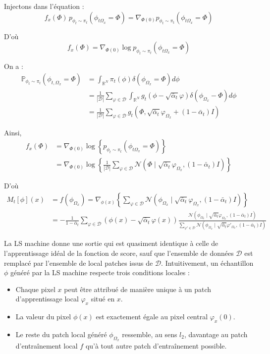 \documentclass[a4paper,10pt]{article}
\theoremstyle{definition} %
\theoremstyle{definition} %
\theoremstyle{definition} %
\theoremstyle{definition} %
\begin{document}
Injectons dans l'équation :
\[ f_x(\Phi)\, p_{\phi_t \sim \pi_t} (\phi_{t \Omega_x} = \Phi) = \nabla_{\Phi(0)} p_{\phi_t \sim \pi_t} (\phi_{t \Omega_x} = \Phi) \]

D'où
\[ f_x(\Phi) = \nabla_{\Phi(0)} \log p_{\phi_t \sim \pi_t} (\phi_{t\Omega_x} = \Phi) \]

On a :
\begin{align*}
\mathbb{P}_{\phi_t \sim \pi_t} (\phi_{t, \Omega_x} = \Phi) &= \int_{\mathbb{R}^N} \pi_t(\phi) \delta(\phi_{\Omega_x} = \Phi) d\phi \\
&= \frac{1}{|\mathcal{D}|} \sum\limits_{\varphi \in \mathcal{D}} \int_{\mathbb{R}^N} g_t(\phi - \sqrt{\bar \alpha_t} \varphi) \delta(\phi_{\Omega_x} - \Phi) d\phi \\
&= \frac{1}{|\mathcal{D}|} \sum\limits_{\varphi \in \mathcal{D}} g_t(\Phi, \sqrt{\bar \alpha_t} \varphi_{\Omega_x} + (1 - \bar \alpha_t) I)
\end{align*}

Ainsi,
\begin{align*}
    f_x(\Phi) &= \nabla_{\Phi(0)} \log \left\{p_{\phi_t \sim \pi_t} (\phi_{t\Omega_x} = \Phi)\right\} \\
    &=\nabla_{\Phi(0)} \log \left\{ \frac{1}{|\mathcal{D}|} \sum\limits_{\varphi \in \mathcal{D}} \mathcal{N}(\Phi \mid \sqrt{\bar \alpha_t} \varphi_{\Omega_x}, (1 - \bar\alpha_t) I) \right\}
\end{align*}

D'où
\begin{align*}
M_t[\phi](x) &= f(\phi_{\Omega_x}) = \nabla_{\phi(x)} \left\{ \sum\limits_{\varphi \in \mathcal{D}} \mathcal{N}(\phi_{\Omega_x} \mid \sqrt{\bar \alpha_t} \varphi_{\Omega_x}, (1 - \bar \alpha_t) I) \right\} \\
&= -\frac{1}{1 - \bar \alpha_t} \sum\limits_{\varphi \in \mathcal{D}} \left(\phi(x) - \sqrt{\bar \alpha_t} \varphi(x)\right) \frac{\mathcal{N}(\phi_{\Omega_x} \mid \sqrt{\bar \alpha_t} \varphi_{\Omega_x}, (1 - \bar \alpha_t) I)}{\sum\limits_{\varphi' \in \mathcal{D}} \mathcal{N}(\phi_{\Omega_x} \mid \sqrt{\bar \alpha_t} \varphi'_{\Omega_x}, (1 - \bar \alpha_t) I)}
\end{align*} 

La LS machine donne une sortie qui est quasiment identique à celle de l'apprentissage idéal de la fonction de score, sauf que l'ensemble de données $\mathcal{D}$ est remplacé par l'ensemble de local patches issus de $\mathcal{D}$. Intuitivement, un échantillon $\phi$ généré par la LS machine respecte trois conditions locales :
\begin{itemize}[topsep=-5pt]
    \item Chaque pixel $x$ peut être attribué de manière unique à un patch d'apprentissage local $\varphi_x$ situé en $x$.
    \item La valeur du pixel $\phi(x)$ est exactement égale au pixel central $\varphi_x(0)$.
    \item Le reste du patch local généré $\phi_{\Omega_x}$ ressemble, au sens $l_2$, davantage au patch d'entraînement local $f$ qu'à tout autre patch d'entraînement possible.
\end{itemize}
\end{document}
